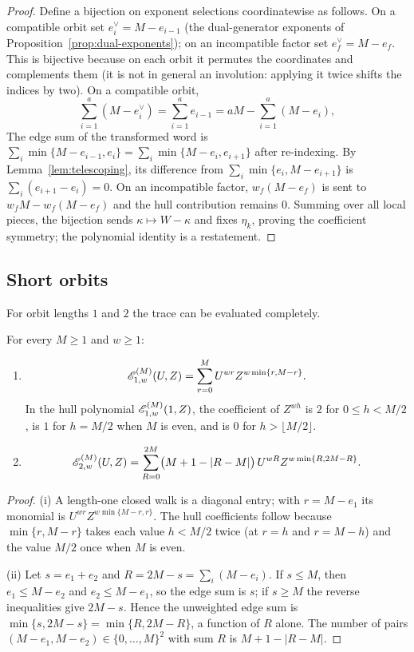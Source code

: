 \begin{proof}
Define a bijection on exponent selections coordinatewise as follows.  On a
compatible orbit set $e_i^\vee=M-e_{i-1}$ (the dual-generator exponents of
Proposition~\ref{prop:dual-exponents}); on an incompatible factor set
$e_f^\vee=M-e_f$.  This is bijective because on each orbit it permutes the
coordinates and complements them (it is not in general an involution: applying
it twice shifts the indices by two).  On a
compatible orbit,
\[
\sum_{i=1}^{a}(M-e_i^\vee)=\sum_{i=1}^{a}e_{i-1}
   =aM-\sum_{i=1}^{a}(M-e_i),
\]
The edge sum of the transformed word is
$\sum_i\min\{M-e_{i-1},e_i\}
 =\sum_i\min\{M-e_i,e_{i+1}\}$ after re-indexing.  By
Lemma~\ref{lem:telescoping}, its difference from
$\sum_i\min\{e_i,M-e_{i+1}\}$ is $\sum_i(e_{i+1}-e_i)=0$.  On an incompatible
factor, $w_f(M-e_f)$ is sent to $w_fM-w_f(M-e_f)$ and the hull contribution
remains $0$.  Summing over all local pieces, the bijection sends
$\kappa\mapsto W-\kappa$ and fixes $\eta_k$, proving the coefficient symmetry;
the polynomial identity is a restatement.
\end{proof}

\subsection{Short orbits}\label{sec:short-orbits}

For orbit lengths $1$ and $2$ the trace can be evaluated completely.

\begin{proposition}\label{prop:short-orbits}
For every $M\geq1$ and $w\geq1$:
\begin{enumerate}
\item[\textup{(i)}]
\[
\mathscr E_{1,w}^{(M)}(U,Z)
 =\sum_{r=0}^{M}U^{wr}Z^{w\min\{r,M-r\}}.
\]
In the hull polynomial $\mathscr E_{1,w}^{(M)}(1,Z)$, the coefficient of $Z^{wh}$
is $2$ for $0\leq h<M/2$, is $1$ for $h=M/2$ when $M$ is even, and is $0$ for
$h>\lfloor M/2\rfloor$.
\item[\textup{(ii)}]
{\small
\[
\mathscr E_{2,w}^{(M)}(U,Z)
 =\sum_{R=0}^{2M}\bigl(M+1-|R-M|\bigr)\,
    U^{wR}Z^{w\min\{R,2M-R\}}.
\]}
\end{enumerate}
\end{proposition}

\begin{proof}
(i) A length-one closed walk is a diagonal entry; with $r=M-e_1$ its monomial is
$U^{wr}Z^{w\min\{M-r,r\}}$.  The hull coefficients follow because
$\min\{r,M-r\}$ takes each value $h<M/2$ twice (at $r=h$ and $r=M-h$) and the
value $M/2$ once when $M$ is even.

(ii) Let $s=e_1+e_2$ and $R=2M-s=\sum_i(M-e_i)$.  If $s\leq M$, then
$e_1\leq M-e_2$ and $e_2\leq M-e_1$, so the edge sum is $s$; if $s\geq M$ the
reverse inequalities give $2M-s$.  Hence the unweighted edge sum is
$\min\{s,2M-s\}=\min\{R,2M-R\}$, a function of $R$ alone.  The number of pairs
$(M-e_1,M-e_2)\in\{0,\ldots,M\}^2$ with sum $R$ is $M+1-|R-M|$.
\end{proof}

